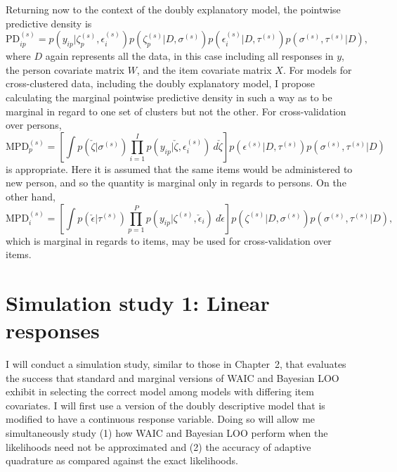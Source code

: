 Returning now to the context of the doubly explanatory model, the pointwise predictive density is
\begin{equation} \label{eq:eirm-lpd}
	\mathrm{PD}_{ip}^{(s)} = 
		p(y_{ip} | \zeta_p^{(s)}, \epsilon_i^{(s)})
		p(\zeta_p^{(s)} | D, \sigma^{(s)})
		p(\epsilon_i^{(s)} | D, \tau^{(s)}) 
		p(\sigma^{(s)}, \tau^{(s)} | D)
,\end{equation}
where $D$ again represents all the data, in this case including all responses in $y$, the person covariate matrix $W$, and the item covariate matrix $X$. For models for cross-clustered data, including the doubly explanatory model, I propose calculating the marginal pointwise predictive density in such a way as to be marginal in regard to one set of clusters but not the other. For cross-validation over persons,
\begin{equation}
	\mathrm{MPD}_p^{(s)} = 
		\left [ \int
			p(\check \zeta | \sigma^{(s)})
			\prod_{i=1}^I	p(y_{ip} | \check \zeta, \epsilon_i^{(s)})
			~d \check \zeta 
		\right ]
		p(\epsilon^{(s)} | D, \tau^{(s)}) 
		p(\sigma^{(s)}, \tau^{(s)} | D)
\end{equation}
is appropriate. Here it is assumed that the same items would be administered to new person, and so the quantity is marginal only in regards to persons. On the other hand,
\begin{equation}
	\mathrm{MPD}_i^{(s)} = 
		\left [ \int
			p(\check \epsilon | \tau^{(s)})
			\prod_{p=1}^P	p(y_{ip} | \zeta^{(s)}, \check \epsilon_i)
			~d \check \epsilon 
		\right ]
		p(\zeta^{(s)} | D, \sigma^{(s)}) 
		p(\sigma^{(s)}, \tau^{(s)} | D)
,\end{equation}
which is marginal in regards to items, may be used for cross-validation over items.


\section{Simulation study 1: Linear responses}

I will conduct a simulation study, similar to those in Chapter~2, that evaluates the success that standard and marginal versions of WAIC and Bayesian LOO exhibit in selecting the correct model among models with differing item covariates. I will first use a version of the doubly descriptive model that is modified to have a continuous response variable. Doing so will allow me simultaneously study (1) how WAIC and Bayesian LOO perform when the likelihoods need not be approximated and (2) the accuracy of adaptive quadrature as compared against the exact likelihoods.

